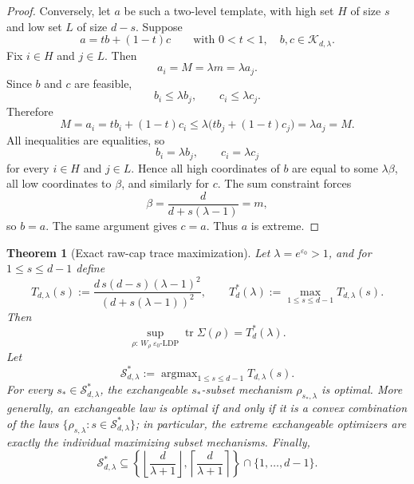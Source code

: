 \documentclass[11pt]{amsart}
\newtheorem{theorem}{Theorem}[section]
\theoremstyle{definition}
\DeclareMathOperator{\tr}{tr}
\DeclareMathOperator{\argmax}{argmax}
\newcommand{\cK}{\mathcal K}
\newcommand{\cS}{\mathcal S}
\begin{document}
\begin{proof}
Conversely, let $a$ be such a two-level template, with high set $H$ of size $s$ and low set $L$ of size $d-s$. Suppose
\[
a=t b+(1-t)c
\qquad\text{with }0<t<1,\quad b,c\in \cK_{d,\lambda}.
\]
Fix $i\in H$ and $j\in L$. Then
\[
a_i=M=\lambda m=\lambda a_j.
\]
Since $b$ and $c$ are feasible,
\[
b_i\le \lambda b_j,
\qquad
c_i\le \lambda c_j.
\]
Therefore
\[
M=a_i=t b_i+(1-t)c_i\le \lambda\bigl(t b_j+(1-t)c_j\bigr)=\lambda a_j=M.
\]
All inequalities are equalities, so
\[
b_i=\lambda b_j,
\qquad
c_i=\lambda c_j
\]
for every $i\in H$ and $j\in L$. Hence all high coordinates of $b$ are equal to some $\lambda \beta$, all low coordinates to $\beta$, and similarly for $c$. The sum constraint forces
\[
\beta=\frac{d}{d+s(\lambda-1)}=m,
\]
so $b=a$. The same argument gives $c=a$. Thus $a$ is extreme.
\end{proof}


\begin{theorem}[Exact raw-cap trace maximization]\label{thm:raw-trace}
Let $\lambda=e^{\varepsilon_0}>1$, and for $1\le s\le d-1$ define
\[
T_{d,\lambda}(s):=\frac{d\,s(d-s)(\lambda-1)^2}{(d+s(\lambda-1))^2},
\qquad
T_d^*(\lambda):=\max_{1\le s\le d-1} T_{d,\lambda}(s).
\]
Then
\[
\sup_{\rho:\,W_\rho\ \varepsilon_0\text{-LDP}}\tr\Sigma(\rho)=T_d^*(\lambda).
\]
Let
\[
\cS_{d,\lambda}^*:=\argmax_{1\le s\le d-1} T_{d,\lambda}(s).
\]
For every $s_*\in \cS_{d,\lambda}^*$, the exchangeable $s_*$-subset mechanism $\rho_{s_*,\lambda}$ is optimal. More generally, an exchangeable law is optimal if and only if it is a convex combination of the laws $\{\rho_{s,\lambda}:s\in \cS_{d,\lambda}^*\}$; in particular, the extreme exchangeable optimizers are exactly the individual maximizing subset mechanisms. Finally,
\[
\cS_{d,\lambda}^*\subseteq \left\{\left\lfloor \frac{d}{\lambda+1}\right\rfloor,\left\lceil \frac{d}{\lambda+1}\right\rceil\right\}\cap \{1,\dots,d-1\}.
\]
\end{theorem}
\end{document}
